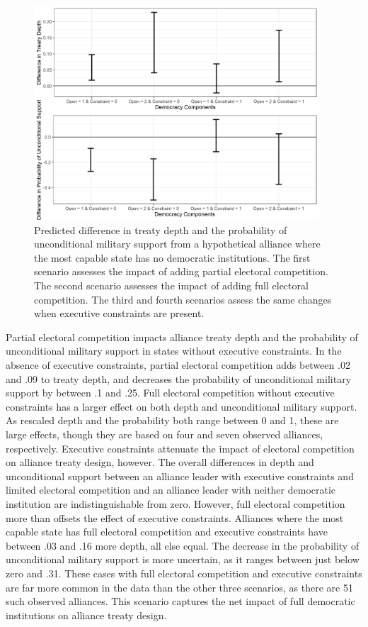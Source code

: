 \documentclass[12pt]{article}
\begin{document}
\begin{figure}[hbtp]
\centering
\includegraphics[width=0.95\textwidth]{../figures/results-diff.png}
\caption{Predicted difference in treaty depth and the probability of unconditional military support from a hypothetical alliance where the most capable state has no democratic institutions. The first scenario assesses the impact of adding partial electoral competition. The second scenario assesses the impact of adding full electoral competition. The third and fourth scenarios assess the same changes when executive constraints are present.}
\label{fig:results-diff}
\end{figure}


Partial electoral competition impacts alliance treaty depth and the probability of unconditional military support in states without executive constraints. 
In the absence of executive constraints, partial electoral competition adds between .02 and .09 to treaty depth, and decreases the probability of unconditional military support by between .1 and .25.
Full electoral competition without executive constraints has a larger effect on both depth and unconditional military support. 
As rescaled depth and the probability both range between 0 and 1, these are large effects, though they are based on four and seven observed alliances, respectively. 
Executive constraints attenuate the impact of electoral competition on alliance treaty design, however. 
The overall differences in depth and unconditional support between an alliance leader with executive constraints and limited electoral competition and an alliance leader with neither democratic institution are indistinguishable from zero. 
However, full electoral competition more than offsets the effect of executive constraints.
Alliances where the most capable state has full electoral competition and executive constraints have between .03 and .16 more depth, all else equal. 
The decrease in the probability of unconditional military support is more uncertain, as it ranges between just below zero and .31. 
These cases with full electoral competition and executive constraints are far more common in the data than the other three scenarios, as there are 51 such observed alliances.
This scenario captures the net impact of full democratic institutions on alliance treaty design. 
\end{document}
